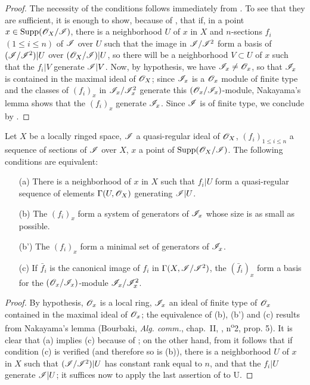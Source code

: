 \begin{proof}
The necessity of the conditions follows immediately from .
To see that they are sufficient, it is enough to show, because of , that if, in a point $x \in \operatorname{Supp}(\mathscr{O}_X/\mathscr{I})$, there is a neighborhood $U$ of $x$ in $X$ and $n$-sections $f_i$ $(1 \leq i \leq n)$ of $\mathscr{I}$ over $U$ such that the image in $\mathscr{I}/\mathscr{I}^2$ form a basis of $(\mathscr{I}/\mathscr{I}^2)|U$ over $(\mathscr{O}_X/\mathscr{I})|U$, so there will be a neighborhood $V \subset U$ of $x$ such that the $f_i|V$ generate $\mathscr{I}|V$.
Now, by hypothesis, we have $\mathscr{I}_x \neq \mathscr{O}_x$, so that $\mathscr{I}_x$ is contained in the maximal ideal of $\mathscr{O}_X$; 
since $\mathscr{I}_x$ is a $\mathscr{O}_x$ module of finite type and the classes of $(f_i)_x$ in $\mathscr{I}_x/\mathscr{I}_x^2$ generate this $(\mathscr{O}_x/\mathscr{I}_x)$-module, Nakayama's lemma shows that the $(f_i)_x$ generate $\mathscr{I}_x$.
Since $\mathscr{I}$ is of finite type, we conclude by .
\end{proof} 

\begin{corollary}[16.9.5]
\label{IV.16.9.5}
Let $X$ be a locally ringed space, $\mathscr{I}$ a quasi-regular ideal of $\mathscr{O}_X$, $(f_i)_{1 \leq i \leq n}$ a sequence of sections of $\mathscr{I}$ over $X$, $x$ a point of $\operatorname{Supp}(\mathscr{O}_X/\mathscr{I})$. 
The following conditions are equivalent:
\begin{enumerate}
  \item[(a)] There is a neighborhood of $x$ in $X$ such that $f_i|U$ form a quasi-regular sequence of elements $\Gamma(U, \mathscr{O}_X)$ generating $\mathscr{I}|U$.
  \item[(b)] The $(f_i)_x$ form a system of generators of $\mathscr{I}_x$ whose size is as small as possible.
  \item[(b')] The $(f_i)_x$ form a minimal set of generators of $\mathscr{I}_x$.
  \item[(c)] If $\bar f_i$ is the canonical image of $f_i$ in $\Gamma(X, \mathscr{I}/\mathscr{I}^2)$, the $(\bar f_i)_x$ form a basis for the $(\mathscr{O}_x/\mathscr{I}_x)$-module $\mathscr{I}_x/\mathscr{I}_x^2$.
\end{enumerate}
\end{corollary}

\begin{proof}
By hypothesis, $\mathscr{O}_x$ is a local ring, $\mathscr{I}_x$ an ideal of finite type of $\mathscr{O}_x$ contained in the maximal ideal of $\mathscr{O}_x$;
the equivalence of (b), (b') and (c) results from Nakayama's lemma (Bourbaki, \emph{Alg. comm.}, chap.~II, , n\textsuperscript{o}2, prop. 5).
It is clear that (a) implies (c) because of ;
on the other hand, from  it follows that if condition (c) is verified (and therefore so is (b)), there is a neighborhood $U$ of $x$ in $X$ such that $(\mathscr{I}/\mathscr{I}^2)|U$ has constant rank equal to $n$, and that the $f_i|U$ generate $\mathscr{I}|U$;
it suffices now to apply the last assertion of  to U.
\end{proof}

